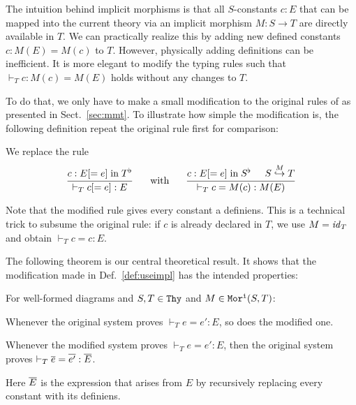 The intuition behind implicit morphisms is that all $S$-constants $c:E$ that can be mapped into the current theory via an implicit morphism $M:S\to T$ are directly available in $T$.
We can practically realize this by adding new defined constants $c:M(E)=M(c)$ to $T$.
However, physically adding definitions can be inefficient.
It is more elegant to modify the typing rules such that $\vdash_T c:M(c)=M(E)$ holds without any changes to $T$.

To do that, we only have to make a small modification to the original rules of \mmt as presented in Sect.~\ref{sec:mmt}.
To illustrate how simple the modification is, the following definition repeat the original rule first for comparison:

\begin{definition}\label{def:useimpl}
We replace the rule
\[\rul{c:E[=e] \minn \flt{T}}{\vdash_T c[=e]:E} \tb \mwith\tb \rul{c:E[=e] \minn \flt{S}\tb \ipc{M}{S}{T}}{\vdash_T c=M(c):M(E)}\]
\end{definition}

Note that the modified rule gives every constant a definiens.
This is a technical trick to subsume the original rule: if $c$ is already declared in $T$, we use $M=\id{T}$ and obtain $\vdash_T c=c:E$.

The following theorem is our central theoretical result.
It shows that the modification made in Def.~\ref{def:useimpl} has the intended properties:
\begin{theorem}
For well-formed diagrams and $S,T\in\Thy$ and $M\in\IMo{S}{T}$:
\begin{compactenum}
 \item Whenever the original system proves $\vdash_T e=e':E$, so does the modified one.
 \item Whenever the modified system proves $\vdash_T e=e':E$, then the original system proves $\vdash_T \ov{e}=\ov{e'}:\ov{E}$.
\end{compactenum}
Here $\ov{E}$ is the expression that arises from $E$ by recursively replacing every constant with its definiens.
\end{theorem}

